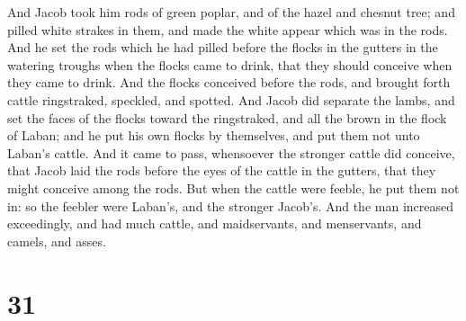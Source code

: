  And Jacob took him rods of green poplar, and of the
hazel and chesnut tree; and pilled white strakes in them, and made the
white appear which was in the rods.  And he set the rods
which he had pilled before the flocks in the gutters in the watering
troughs when the flocks came to drink, that they should conceive when
they came to drink.  And the flocks conceived before the
rods, and brought forth cattle ringstraked, speckled, and spotted.
 And Jacob did separate the lambs, and set the faces of
the flocks toward the ringstraked, and all the brown in the flock of
Laban; and he put his own flocks by themselves, and put them not unto
Laban's cattle.  And it came to pass, whensoever the
stronger cattle did conceive, that Jacob laid the rods before the eyes
of the cattle in the gutters, that they might conceive among the rods.
 But when the cattle were feeble, he put them not in: so
the feebler were Laban's, and the stronger Jacob's.  And
the man increased exceedingly, and had much cattle, and maidservants,
and menservants, and camels, and asses.

\hypertarget{section-30}{%
\section{31}\label{section-30}}

